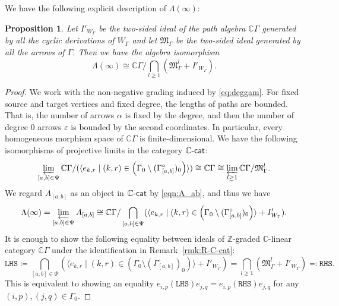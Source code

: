\documentclass[12pt]{amsart}
\newtheorem{proposition}[theorem]{Proposition}
\theoremstyle{definition}
\theoremstyle{remark}
\numberwithin{equation}{section}
\begin{document}
We have the following explicit description of $\Lambda(\infty)$:
\begin{proposition}\label{prop:Lambdainfty}
    Let $I'_{W_{\Gamma}}$ be the two-sided ideal of the path algebra $\mathbb{C}\Gamma$ generated by all the cyclic derivations of $W_{\Gamma}$ and let $\mathfrak{M}_{\Gamma}$ be the two-sided ideal generated by all the arrows of $\Gamma$. Then we have the algebra isomorphism
    \[
    \Lambda(\infty) \cong \mathbb{C}\Gamma/ \bigcap_{l\geq 1}(\mathfrak{M}_{\Gamma}^l+I'_{W_{\Gamma}}).
    \]
\end{proposition}
\begin{proof}
    We work with the non-negative grading induced by \eqref{eq:deggam}. For fixed source and target vertices and fixed degree, the lengths of paths are bounded. That is, the number of arrows $\alpha$ is fixed by the degree, and then the number of degree $0$ arrows $\varepsilon$ is bounded by the second coordinates. In particular, every homogeneous morphism space of $\mathbb C\Gamma$ is finite-dimensional. We have the following isomorphisms of projective limits in the category $\mathbb{C}\mathchar`-\mathsf{cat}$:
    \begin{align*}
     \varprojlim_{[a,b]\in \Psi}\mathbb C\Gamma/ (\langle e_{k,r} \mid (k,r)\in \left(\Gamma_0\setminus (\Gamma_{[a,b]}^{\circ})_0\right)\rangle)\cong \mathbb{C}\Gamma \cong \varprojlim_{l\geq 1} \mathbb{C}\Gamma/\mathfrak{M}_{\Gamma}^l.
    \end{align*}
We regard $A_{[a,b]}$ as an object in $\mathbb{C}\mathchar`-\mathsf{cat}$ by \eqref{eqn:A_ab}, and thus we have
\[ \Lambda(\infty)= \varprojlim_{[a,b]\in \Psi}A_{[a,b]}\cong \mathbb C\Gamma/\bigcap_{[a,b] \in \Psi} (\langle e_{k,r} \mid (k,r)\in \left(\Gamma_0\setminus (\Gamma_{[a,b]}^{\circ})_0\right)\rangle+ I'_{W_{\Gamma}}).
\]
    It is enough to show the following equality between ideals of $\mathbb{Z}$-graded $\mathbb{C}$-linear category $\mathbb{C}\Gamma$ under the identification in Remark~\ref{rmk:R-C-cat}: \[\mathtt{LHS}\coloneqq \bigcap_{[a,b] \in \Psi} (\langle e_{k,r} \mid (k,r)\in \left(\Gamma_0\setminus (\Gamma_{[a,b]}^{\circ})_0\right)\rangle+ I'_{W_{\Gamma}})=\bigcap_{l\geq1}(\mathfrak{M}_{\Gamma}^l+ I'_{W_{\Gamma}}) \eqqcolon \mathtt{RHS}.\]
This is equivalent to showing an equality $e_{i,p}(\mathtt{LHS})e_{j,q}=e_{i,p}(\mathtt{RHS})e_{j,q}$ for any $(i,p), (j,q)\in\Gamma_0$. 



\end{proof}
\end{document}
